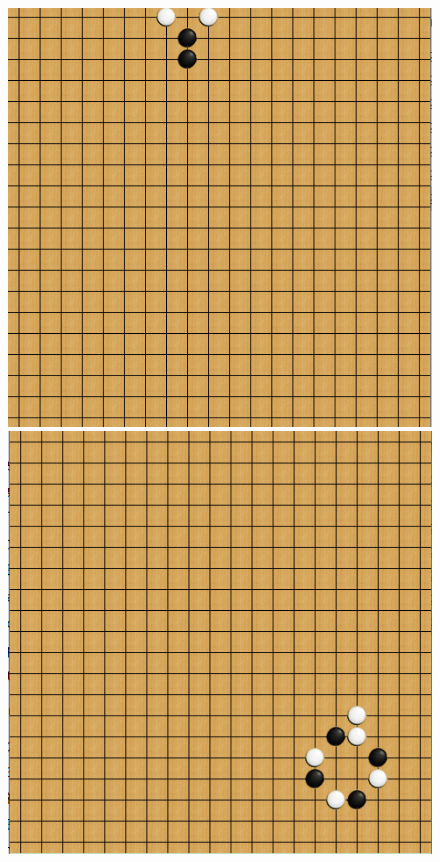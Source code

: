 \documentclass[a4paper, 11pt]{article} %
\begin{document}
\begin{multicols}{2}
    \begin{figure}[H]
    	\centering
    	\parbox{0.25\linewidth}{
    		\includegraphics[width=\linewidth]{opening1.png}
    	}\quad
    	\parbox{0.25\linewidth}{
    		\includegraphics[width=\linewidth]{opening2.png}
}
\end{figure}
\end{multicols}
\end{document}
